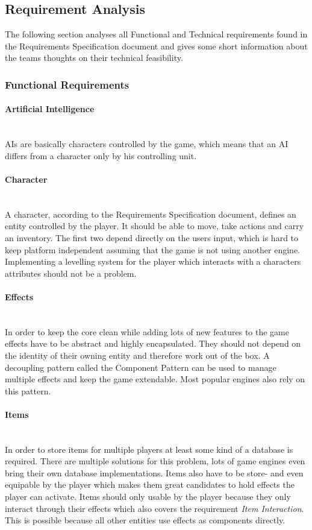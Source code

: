 \documentclass[11pt]{article}
\begin{document}
\subsection{Requirement Analysis}
The following section analyses all Functional and Technical requirements found in the Requirements Specification document and gives some short information about the teams thoughts on their technical feasibility.

\subsubsection{Functional Requirements}
\paragraph{Artificial Intelligence}~\\
AIs are basically characters controlled by the game, which means that an AI differs from a character only by his controlling unit.
\paragraph{Character}~\\
A character, according to the Requirements Specification document, defines an entity controlled by the player.
It should be able to move, take actions and carry an inventory. The first two depend directly on the users input, which is hard to keep platform independent assuming that the game is not using another engine.
Implementing a levelling system for the player which interacts with a characters attributes should not be a problem.
\paragraph{Effects}~\\
In order to keep the core clean while adding lots of new features to the game effects have to be abstract and highly encapsulated. They should not depend on the identity of their owning entity and therefore work out of the box.
A decoupling pattern called the Component Pattern can be used to manage multiple effects and keep the game extendable. Most popular engines also rely on this pattern.
\paragraph{Items}~\\
In order to store items for multiple players at least some kind of a database is required. There are multiple solutions for this problem, lots of game engines even bring their own database implementations.
Items also have to be store- and even equipable by the player which makes them great candidates to hold effects the player can activate. Items should only usable by the player because they only interact through their effects which also covers the requirement \textit{Item Interaction}. 
This is possible because all other entities use effects as components directly.
\end{document}
